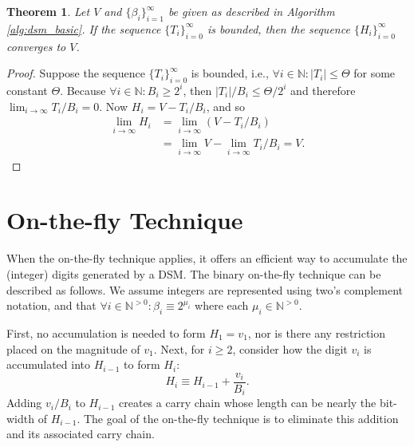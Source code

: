 \documentclass[10pt]{article}
\newtheorem{thm}{Theorem}[section]
\theoremstyle{definition}
\theoremstyle{remark}
\numberwithin{equation}{section}
\newcommand{\nats}{\mathbb{N}}
\newcommand{\pnats}{\mathbb{N}^{>0}}
\newcommand{\abs}[1]{\lvert #1 \rvert}
\begin{document}
\begin{thm}\label{thm:dsm_bnd_convergence}
Let $V$ and $\{\beta_i\}_{i=1}^\infty$ be given as described in Algorithm \ref{alg:dsm_basic}. If the sequence $\{T_i\}_{i=0}^\infty$ is bounded, then the sequence $\{H_i\}_{i=0}^\infty$ converges to $V$. 
\end{thm}
\begin{proof}
Suppose the sequence $\{T_i\}_{i=0}^\infty$ is bounded, i.e., $\forall i \in \nats: \abs{T_i} \le \Theta$ for some constant $\Theta$. Because $\forall i \in \nats: B_i \ge 2^i$, then $\abs{T_i}/B_i \le \Theta/2^i$ and therefore $\lim_{i \rightarrow \infty} T_i/B_i = 0$.
Now $H_i = V - T_i/B_i$, and so
\begin{align*}
\lim_{i \rightarrow \infty} H_i &= \lim_{i \rightarrow \infty} (V - T_i/B_i) \\
	&= \lim_{i \rightarrow \infty} V -  \lim_{i \rightarrow \infty} T_i/B_i = V .
\end{align*} 
\end{proof}

\section{On-the-fly Technique\label{sec:onthefly}}

When the on-the-fly technique applies, it offers an efficient way to accumulate the (integer) digits generated by a DSM. 
The binary on-the-fly technique can be described as follows.
We assume integers are represented using two's complement notation, and that $\forall i \in \pnats: \beta_i \equiv 2^{\mu_i}$ where each $\mu_i \in \pnats$.

First, no accumulation is needed to form $H_1 = v_1$, nor is there any restriction placed on the magnitude of $v_1$. 
Next, for $i \ge 2$, consider how the digit $v_i$ is accumulated into $H_{i-1}$ to form $H_i$:
\[
H_i \equiv H_{i-1} + \frac{v_i}{B_i} .
\]
Adding $v_i/B_i$ to $H_{i-1}$ creates a carry chain whose length can be nearly the bit-width of $H_{i-1}$.
The goal of the on-the-fly technique is to eliminate this addition and its associated carry chain.
\end{document}
